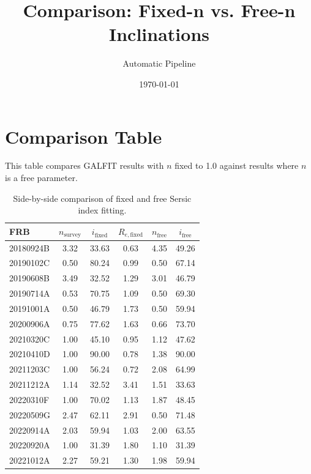 \documentclass{article}
\title{Comparison: Fixed-n vs. Free-n Inclinations}
\author{Automatic Pipeline}
\date{\today}
\begin{document}
\maketitle

\section{Comparison Table}
This table compares GALFIT results with $n$ fixed to 1.0 against results where $n$ is a free parameter.

\begin{table}[h!]
    \centering
    \small
    \begin{tabular}{l|c|cc|cc}
    \hline
    FRB & $n_{\text{survey}}$ & $i_{\text{fixed}}$ & $R_{e,\text{fixed}}$ & $n_{\text{free}}$ & $i_{\text{free}}$ \\
    \hline
    20180924B & 3.32 & 33.63 & 0.63 & 4.35 & 49.26 \\
    20190102C & 0.50 & 80.24 & 0.99 & 0.50 & 67.14 \\
    20190608B & 3.49 & 32.52 & 1.29 & 3.01 & 46.79 \\
    20190714A & 0.53 & 70.75 & 1.09 & 0.50 & 69.30 \\
    20191001A & 0.50 & 46.79 & 1.73 & 0.50 & 59.94 \\
    20200906A & 0.75 & 77.62 & 1.63 & 0.66 & 73.70 \\
    20210320C & 1.00 & 45.10 & 0.95 & 1.12 & 47.62 \\
    20210410D & 1.00 & 90.00 & 0.78 & 1.38 & 90.00 \\
    20211203C & 1.00 & 56.24 & 0.72 & 2.08 & 64.99 \\
    20211212A & 1.14 & 32.52 & 3.41 & 1.51 & 33.63 \\
    20220310F & 1.00 & 70.02 & 1.13 & 1.87 & 48.45 \\
    20220509G & 2.47 & 62.11 & 2.91 & 0.50 & 71.48 \\
    20220914A & 2.03 & 59.94 & 1.03 & 2.00 & 63.55 \\
    20220920A & 1.00 & 31.39 & 1.80 & 1.10 & 31.39 \\
    20221012A & 2.27 & 59.21 & 1.30 & 1.98 & 59.94 \\
    \hline
    \end{tabular}
    \caption{Side-by-side comparison of fixed and free Sersic index fitting.}
\end{table}
\end{document}
